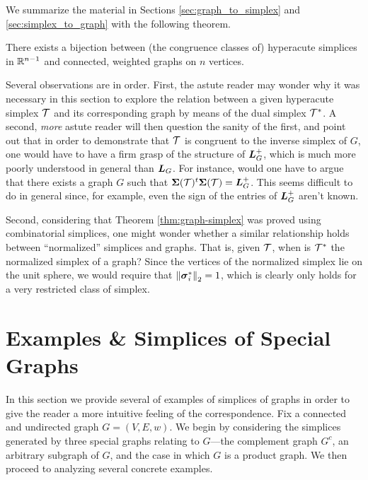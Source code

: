 We summarize the material in Sections \ref{sec:graph_to_simplex} and \ref{sec:simplex_to_graph} with the following theorem. 

\begin{theorem}
	\label{thm:graph-simplex}
	There exists a bijection between (the congruence classes of) hyperacute  simplices in $\mathbb{R}^{n-1}$ and connected, weighted graphs on $n$ vertices. 
\end{theorem}

Several observations are in order. 
First, the astute reader may wonder why it was necessary in this section to explore the relation between a given hyperacute simplex $\mathcal{T}$ and its corresponding graph by means of the dual simplex $\mathcal{T}^*$. A second, \emph{more} astute reader will then question the sanity  of the first, and point out that in order to demonstrate that $\mathcal{T}$ is congruent to the inverse simplex of $G$, one would have to have a firm grasp of the structure of $\vb*{L}_G^+$, which is much more poorly understood in general than $\vb*{L}_G$. For instance, would one have to argue that there exists a graph $G$ such that $\boldsymbol{\Sigma}(\mathcal{T})^t \boldsymbol{\Sigma}(\mathcal{T}) = \vb*{L}_G^+$. This seems difficult to do in general since, for example, even the sign of the entries of $\vb*{L}_G^+$ aren't known. 

Second, considering that Theorem \ref{thm:graph-simplex} was proved using combinatorial simplices, one might wonder whether a similar relationship holds between ``normalized'' simplices and graphs. That is, given $\mathcal{T}$, when is $\mathcal{T}^*$ the normalized simplex of a graph? Since the vertices of the normalized simplex lie on the unit sphere, we would require that $\norm{\vb*{\sigma}_i^*}_2=1$, which is clearly only holds for a very restricted class of simplex. 


\section{Examples \& Simplices of Special Graphs}
\label{sec:special_graphs}
In this section we provide several of examples of simplices of graphs in order to give the reader a more intuitive feeling of the correspondence. 
Fix a connected and undirected graph $G=(V,E,w)$. 
We begin by considering the simplices generated by three special graphs relating to $G$---the complement graph $G^c$, an arbitrary subgraph of $G$, and the case in which $G$ is a product graph. 
We then proceed to analyzing several concrete examples. 


